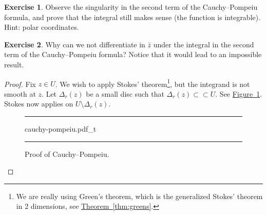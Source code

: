 \documentclass[12pt,openany]{book}
\theoremstyle{plain}
\theoremstyle{remark}
\theoremstyle{definition}
\newenvironment{exbox}{%
    \def\FrameCommand{\vrule width 1pt \relax\hspace{10pt}}%
    \MakeFramed{\advance\hsize-\width\FrameRestore}%
}{%
    \endMakeFramed
}
\newenvironment{myfig}{%
\begin{figure}[h!t]
\noindent\rule{\textwidth}{0.5pt}\vspace{12pt}\par\centering}%
{\par\noindent\rule{\textwidth}{0.5pt}
\end{figure}}
\theoremstyle{exercise}
\newtheorem{exercise}{Exercise}[section]
\theoremstyle{example}
\newcommand{\figureref}[1]{\hyperref[#1]{Figure~\ref*{#1}}}
\newcommand{\thmref}[1]{\hyperref[#1]{Theorem~\ref*{#1}}}
\begin{document}
\begin{exbox}
\begin{exercise}
Observe the singularity in the second term of the Cauchy--Pompeiu formula,
and prove that the integral still makes
sense (the function is integrable).  Hint: polar coordinates.
\end{exercise}

\begin{exercise}
Why can we not differentiate in $\bar{z}$ under the integral in the second
term of the Cauchy--Pompeiu formula?
Notice that it would lead to an impossible result.
\end{exercise}
\end{exbox}

\begin{proof}
Fix $z \in U$.  We wish to apply Stokes' theorem\footnote{%
We are really using Green's theorem, which is the generalized
Stokes' theorem in $2$ dimensions, see \thmref{thm:greens}.},
but the integrand is not smooth at $z$.
Let $\Delta_r(z)$ be a small disc such that
$\Delta_r(z) \subset
\subset U$.  See \figureref{fig:cauchy-pompeiu}.
Stokes now applies on $U \setminus \Delta_r(z)$.

\begin{myfig}
{cauchy-pompeiu.pdf_t}
\caption{Proof of Cauchy--Pompeiu.\label{fig:cauchy-pompeiu}}
\end{myfig}


\end{proof}
\end{document}
